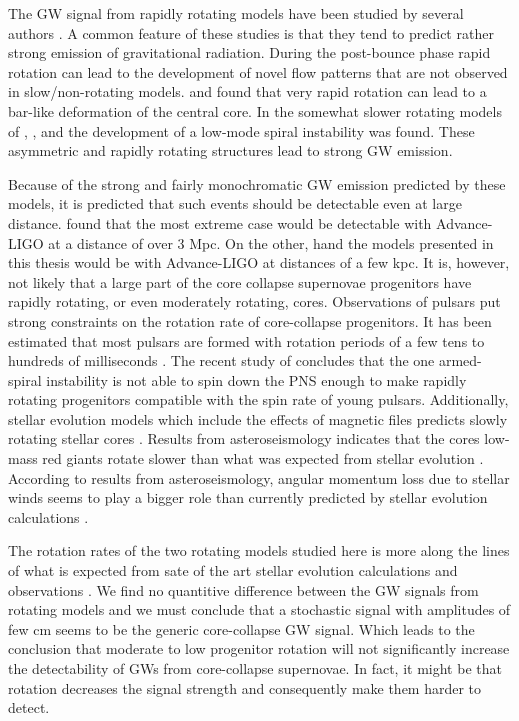 The GW signal from rapidly rotating models have been studied 
by several authors \citep{mueller_82,rampp_98,shibata_05,ott_05,scheidegger_10,kuroda_14,takiwaki_16}. 
A common feature of these studies is that they tend to predict rather strong emission of gravitational radiation. During the post-bounce phase rapid rotation can lead to the
development of novel flow patterns that are not observed in slow/non-rotating models.
\cite{rampp_98} and \cite{shibata_05} found that very rapid rotation can
lead to a bar-like deformation of the central core. In the somewhat slower 
rotating models of \cite{ott_05}, \cite{kuroda_14}, and \cite{takiwaki_16} the development of
a low-mode spiral instability was found. These asymmetric and rapidly rotating structures
lead to strong GW emission. 

Because of the strong and fairly monochromatic GW emission predicted by these models,
it is predicted that such events should be detectable even at large distance. \citep{gossan_15} found that the
most extreme case would be detectable with Advance-LIGO at a distance of over 3 Mpc. On the other, hand
the models presented in this thesis would be with Advance-LIGO at distances of a few kpc. 
It is, however, not likely that a large part of the core collapse supernovae progenitors
have rapidly rotating, or even moderately rotating, cores. Observations of pulsars put
strong constraints on the rotation rate of core-collapse progenitors. It has been estimated that
most pulsars are formed with rotation periods of a few tens to hundreds of milliseconds \citep{vranesevic_04,popov_12,noutsos_13}.
The recent study of \cite{kazeroni_17} concludes that
the one armed-spiral instability \citep{ott_05,kuroda_14,takiwaki_16} is not able to spin down the PNS enough to make rapidly rotating progenitors compatible with the spin rate of young
pulsars. Additionally, stellar evolution models which include the effects of magnetic files predicts
slowly rotating stellar cores \citep{heger_05}. Results from asteroseismology \cite{beck_12,mosser_12} indicates
that the cores low-mass red giants rotate slower than what was expected from stellar evolution \citep{cantiello_14,deheuvels_14}.
According to results from asteroseismology, angular momentum loss due to stellar winds seems to play a bigger role than currently predicted by stellar evolution calculations \citep{cantiello_14}. 

The rotation rates of the two rotating models studied here is more along the lines of what 
is expected from sate of the art stellar evolution calculations \citep{heger_05} and observations 
\citep{beck_12,mosser_12,popov_12,noutsos_13,cantiello_14,deheuvels_14}. 
We find no quantitive difference between the GW signals from rotating models and we must conclude that
a stochastic signal with amplitudes of few cm seems to be the generic core-collapse GW signal.
Which leads to the conclusion that moderate to low progenitor rotation will not significantly increase the detectability of 
GWs from core-collapse supernovae. In fact, it might be that rotation decreases the signal strength and consequently make them harder to detect. 

